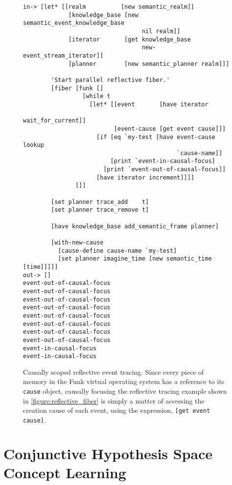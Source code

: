 \begin{figure}[h]
\centering
{\small
\begin{Verbatim}[frame=single]
 in-> [let* [[realm          [new semantic_realm]]
             [knowledge_base [new semantic_event_knowledge_base
                                  nil realm]]
             [iterator       [get knowledge_base
                                  new-event_stream_iterator]]
             [planner        [new semantic_planner realm]]]

        'Start parallel reflective fiber.'
        [fiber [funk []
                 [while t
                   [let* [[event       [have iterator
                                             wait_for_current]]
                          [event-cause [get event cause]]]
                     [if [eq `my-test [have event-cause lookup
                                            `cause-name]]
                         [print `event-in-causal-focus]
                       [print `event-out-of-causal-focus]]
                     [have iterator increment]]]]
               []]
        
        [set planner trace_add    t]
        [set planner trace_remove t]
        
        [have knowledge_base add_semantic_frame planner]
        
        [with-new-cause
          [cause-define cause-name `my-test]
          [set planner imagine_time [new semantic_time [time]]]]]
out-> []
event-out-of-causal-focus
event-out-of-causal-focus
event-out-of-causal-focus
event-out-of-causal-focus
event-out-of-causal-focus
event-out-of-causal-focus
event-out-of-causal-focus
event-out-of-causal-focus
event-in-causal-focus
event-in-causal-focus
\end{Verbatim}
}
\caption[Causally scoped reflective event tracing.]{Causally scoped
  reflective event tracing.  Since every piece of memory in the Funk
  virtual operating system has a reference to its {\tt{cause}} object,
  causally focusing the reflective tracing example shown in
  {\mbox{\autoref{figure:reflective_fiber}}} is simply a matter of
  accessing the creation cause of each event, using the expression,
  {\tt{[get event cause]}}.}
\label{figure:reflective_event_causal_tracing}
\end{figure}

\section{Conjunctive Hypothesis Space Concept Learning}

